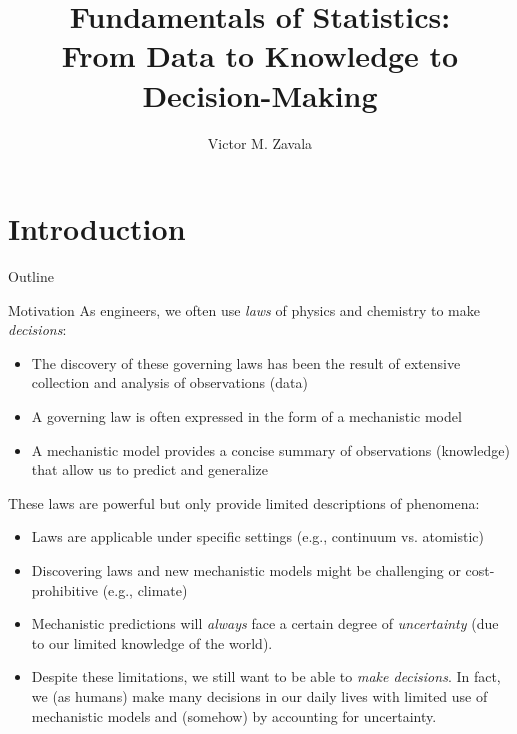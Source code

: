 \documentclass[9pt]{beamer}
\title{\LARGE Fundamentals of Statistics: \\ {\large From Data to Knowledge to Decision-Making}}
\author{Victor M. Zavala}
\institute[UW-Madison] 
{\small
  Department of Chemical and Biological Engineering\\
  University of Wisconsin-Madison\\
\medskip
\textit{victor.zavala@wisc.edu}
}
\date{}
\begin{document}
\begin{frame}
  \titlepage
\end{frame}


\section{Introduction}
\begin{frame}{Outline}
\tableofcontents[currentsection]
\end{frame}

\begin{frame}{Motivation}
As engineers, we often use {\em laws} of physics and chemistry to make {\em decisions}:
      \begin{block}{}
        \begin{itemize}
      \item The discovery of these governing laws has been the result of extensive collection and analysis of observations (data) 
      \item A governing law is often expressed in the form of a mechanistic model
      \item A mechanistic model provides a concise summary of observations (knowledge) that allow us to predict and generalize
      \end{itemize}
      \end{block}
These laws are powerful but only provide limited descriptions of phenomena:
      \begin{block}{}
      \begin{itemize}
      \item Laws are applicable under specific settings (e.g., continuum vs. atomistic) 
      \item Discovering laws and new mechanistic models might be challenging or cost-prohibitive (e.g., climate)
      \end{itemize}
      \end{block}
      \begin{itemize}
      \item Mechanistic predictions will {\em always} face a certain degree of {\em uncertainty} (due to our limited knowledge of the world). 
      \item Despite these limitations, we still want to be able to {\em make decisions}. In fact, we (as humans) make many decisions  in our daily lives with limited use of mechanistic models and (somehow) by accounting for uncertainty. 
      \end{itemize}
\end{frame}
\end{document}
